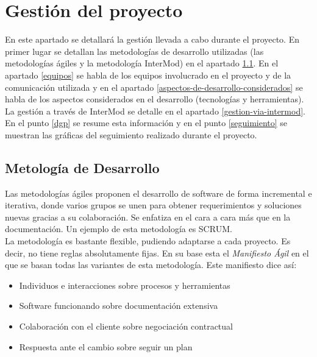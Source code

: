 
\chapter{Gestión del proyecto}
\label{gestion}

En este apartado se detallará la gestión llevada a cabo durante el proyecto. En primer lugar se detallan las metodologías de desarrollo utilizadas (las metodologías ágiles y la metodología InterMod) en el apartado \ref{metodologias}. En el apartado \ref{equipos} se habla de los equipos involucrado en el proyecto y de la comunicación utilizada y en el apartado \ref{aspectos-de-desarrollo-considerados} se habla de los aspectos considerados en el desarrollo (tecnologías y herramientas). La gestión a través de InterMod se detalle en el apartado \ref{gestion-via-intermod}. En el punto \ref{dgp} se resume esta información y en el punto \ref{seguimiento} se muestran las gráficas del seguimiento realizado durante el proyecto.\\

\section{Metología de Desarrollo}
\label{metodologias}

Las metodologías ágiles proponen el desarrollo de software de forma incremental e iterativa, donde varios grupos se unen para obtener requerimientos y soluciones nuevas gracias a su colaboración. Se enfatiza en el cara a cara más que en la documentación. Un ejemplo de esta metodología es SCRUM.\\

La metodología es bastante flexible, pudiendo adaptarse a cada proyecto. Es decir, no tiene reglas absolutamente fijas. En su base esta el \textit{Manifiesto Ágil} en el que se basan todas las variantes de esta metodología. Este manifiesto \hyperref[manifiestoagil]{\cite{manifiestoagil}} dice así:

\begin{itemize}
\item Individuos e interacciones sobre procesos y herramientas
\item Software funcionando sobre documentación extensiva
\item Colaboración con el cliente sobre negociación contractual
\item Respuesta ante el cambio sobre seguir un plan
\end{itemize}

